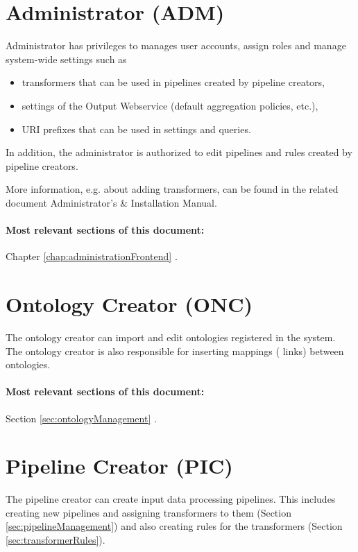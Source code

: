 \section[Administrator]{Administrator (ADM)}

	Administrator has privileges to manages user accounts, assign roles and manage system-wide settings such as
	\begin{itemize}
		\item transformers that can be used in pipelines created by pipeline creators,
		\item settings of the Output Webservice (default aggregation policies, etc.),
		\item URI prefixes that can be used in settings and queries.
	\end{itemize}

	In addition, the administrator is authorized to edit pipelines and rules created by pipeline creators.

	More information, e.g. about adding transformers, can be found in the related document Administrator's \& Installation Manual.

	\paragraph{Most relevant sections of this document:} Chapter \ref{chap:administrationFrontend} .

\section[Ontology Creator]{Ontology Creator (ONC)}
	The ontology creator can import and edit ontologies registered in the system. The ontology creator is also responsible for inserting mappings ( links) between ontologies.

	\paragraph{Most relevant sections of this document:} Section \ref{sec:ontologyManagement} .

\section[Pipeline Creator]{Pipeline Creator (PIC)}
	The pipeline creator can create input data processing pipelines. This includes creating new pipelines and assigning transformers to them (Section \ref{sec:pipelineManagement}) and also creating rules for the transformers (Section \ref{sec:transformerRules}).

